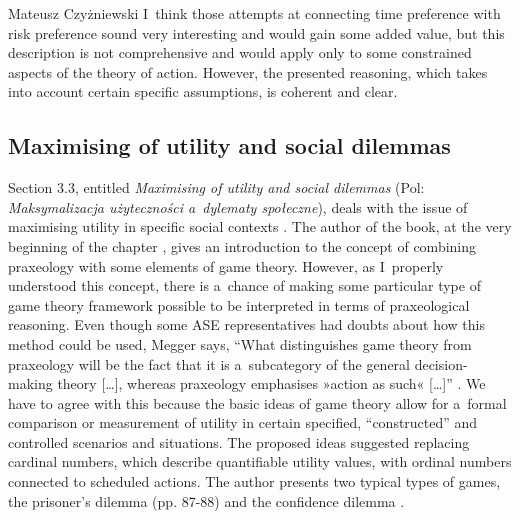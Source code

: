 \begin{newrevengenv}{Mateusz Czyżniewski}
I~think those attempts at connecting time preference with risk preference sound very interesting and would gain some added value, but this description is not comprehensive and would apply only to some constrained aspects of the theory of action. However, the presented reasoning, which takes into account certain specific assumptions, is coherent and clear.



\subsection{Maximising of utility and social dilemmas}



Section 3.3, entitled \textit{Maximising of utility and social dilemmas} (Pol: \textit{Maksymalizacja użyteczności a~dylematy społeczne}), deals with the issue of maximising utility in specific social contexts 
\parencite[][pp.82–94]{megger_sprawiedliwosc_2021}. %
 The author of the book, at the very beginning of the chapter 
\parencite[][pp.83–86]{megger_sprawiedliwosc_2021}, %
 gives an introduction to the concept of combining praxeology with some elements of game theory. However, as I~properly understood this concept, there is a~chance of making some particular type of game theory framework possible to be interpreted in terms of praxeological reasoning. Even though some ASE representatives had doubts about how this method could be used, Megger says, ``What distinguishes game theory from praxeology will be the fact that it is a~subcategory of the general decision-making theory […], whereas praxeology emphasises »action as such« […]'' 
\parencite[][p.85]{megger_sprawiedliwosc_2021}. %
 We have to agree with this because the basic ideas of game theory allow for a~formal comparison or measurement of utility in certain specified, ``constructed'' and controlled scenarios and situations. The proposed ideas suggested replacing cardinal numbers, which describe quantifiable utility values, with ordinal numbers connected to scheduled actions. The author presents two typical types of games, the prisoner's dilemma (pp. 87-88) and the confidence dilemma 
\parencite[][pp.89–91]{megger_sprawiedliwosc_2021}.%





\end{newrevengenv}
